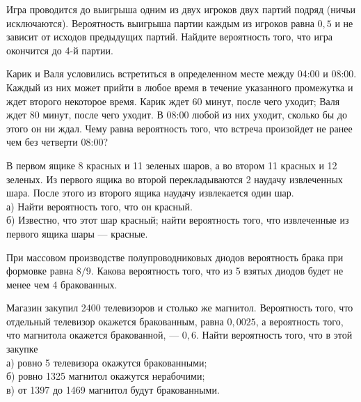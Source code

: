 \newpage\setcounter{zad}{0}



\begin{zkrW}{20}\noindent 
	Игра проводится до выигрыша одним из двух игроков двух партий подряд (ничьи исключаются). Вероятность выигрыша партии каждым из игроков равна $0{,}5$ и не зависит от исходов предыдущих партий. Найдите вероятность того, что игра окончится до 4-й партии.
 
\end{zkrW}

\begin{zkrW}{20}\noindent 
	Карик и Валя условились встретиться в определенном месте между 04:00 и 08:00. Каждый из них может прийти в любое время в течение указанного промежутка и ждет второго некоторое время. Карик ждет 60 минут, после чего уходит; Валя ждет 80 минут, после чего уходит. В 08:00 любой из них уходит, сколько бы до этого он ни ждал. Чему равна вероятность того, что встреча произойдет не ранее чем без четверти 08:00?
 
\end{zkrW}

\begin{zkrW}{20}\noindent 
	В первом ящике 8 красных и 11 зеленых шаров, а во втором 11 красных и 12 зеленых. Из первого ящика во второй перекладываются 2 наудачу извлеченных шара. После этого из второго ящика наудачу извлекается один шар. \\ \indent а) Найти вероятность того, что он красный. \\ \indent б) Известно, что этот шар красный; найти вероятность того, что извлеченные из первого ящика шары --- красные.
 
\end{zkrW}

\begin{zkrW}{20}\noindent 
	При массовом производстве полупроводниковых диодов вероятность брака при формовке равна $8/9$. Какова вероятность того, что из 5 взятых диодов будет не менее чем 4 бракованных.
 
\end{zkrW}

\begin{zkrW}{20}\noindent 
	Магазин закупил 2400 телевизоров и столько же магнитол. Вероятность того, что отдельный телевизор окажется бракованным, равна $0{,}0025$, а вероятность того, что магнитола окажется бракованной, --- $0{,}6$. Найти вероятность того, что в этой закупке \\ \indent а) ровно 5 телевизора окажутся бракованными; \\ \indent б) ровно 1325 магнитол окажутся нерабочими; \\ \indent в) от 1397 до 1469 магнитол будут бракованными.
 
\end{zkrW}

